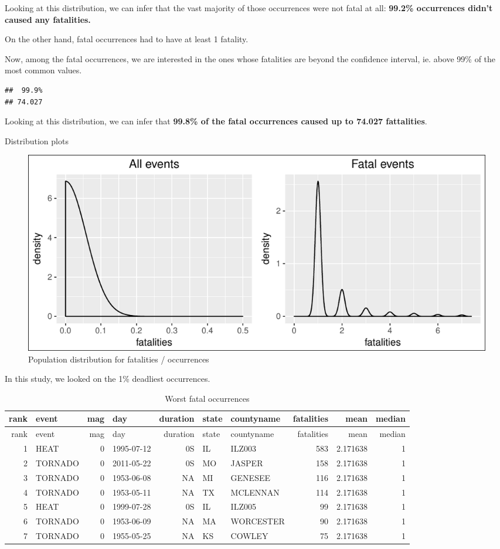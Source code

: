 \documentclass[]{article}
\begin{document}
Looking at this distribution, we can infer that the vast majority of
those occurrences were not fatal at all: \textbf{99.2\% occurrences
didn't caused any fatalities.}

On the other hand, fatal occurrences had to have at least 1 fatality.

Now, among the fatal occurrences, we are interested in the ones whose
fatalities are beyond the confidence interval, ie. above 99\% of the
most common values.

\begin{verbatim}
##  99.9% 
## 74.027
\end{verbatim}

Looking at this distribution, we can infer that \textbf{99.8\% of the
fatal occurrences caused up to 74.027 fattalities}.

Distribution plots

\begin{figure}[htbp]
\centering
\includegraphics{readme_files/figure-latex/fatal-distr-4-1.pdf}
\caption{Population distribution for fatalities / occurrences}
\end{figure}

In this study, we looked on the 1\% deadliest occurrences.

\begin{longtable}[]{@{}rlrlrllrrr@{}}
\caption{Worst fatal occurrences}\tabularnewline
\toprule
rank & event & mag & day & duration & state & countyname & fatalities &
mean & median\tabularnewline
\midrule
\endfirsthead
\toprule
rank & event & mag & day & duration & state & countyname & fatalities &
mean & median\tabularnewline
\midrule
\endhead
1 & HEAT & 0 & 1995-07-12 & 0S & IL & ILZ003 & 583 & 2.171638 &
1\tabularnewline
2 & TORNADO & 0 & 2011-05-22 & 0S & MO & JASPER & 158 & 2.171638 &
1\tabularnewline
3 & TORNADO & 0 & 1953-06-08 & NA & MI & GENESEE & 116 & 2.171638 &
1\tabularnewline
4 & TORNADO & 0 & 1953-05-11 & NA & TX & MCLENNAN & 114 & 2.171638 &
1\tabularnewline
5 & HEAT & 0 & 1999-07-28 & 0S & IL & ILZ005 & 99 & 2.171638 &
1\tabularnewline
6 & TORNADO & 0 & 1953-06-09 & NA & MA & WORCESTER & 90 & 2.171638 &
1\tabularnewline
7 & TORNADO & 0 & 1955-05-25 & NA & KS & COWLEY & 75 & 2.171638 &
1\tabularnewline
\bottomrule
\end{longtable}
\end{document}

